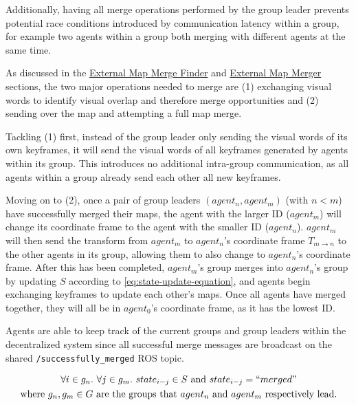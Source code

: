 Additionally, having all merge operations performed by the group leader prevents potential race conditions introduced by communication latency within a group, for example two agents within a group both merging with different agents at the same time.

As discussed in the \hyperref[sec:external-map-merge-finder]{External Map Merge Finder} and \hyperref[sec:external-map-merger]{External Map Merger} sections, the two major operations needed to merge are (1) exchanging visual words to identify visual overlap and therefore merge opportunities and (2) sending over the map and attempting a full map merge.

Tackling (1) first, instead of the group leader only sending the visual words of its own keyframes, it will send the visual words of all keyframes generated by agents within its group. This introduces no additional intra-group communication, as all agents within a group already send each other all new keyframes.

Moving on to (2), once a pair of group leaders $(agent_n, agent_m)$ (with $n<m$) have successfully merged their maps, the agent with the larger ID ($agent_m$) will change its coordinate frame to the agent with the smaller ID ($agent_n$). $agent_m$ will then send the transform from $agent_m$ to $agent_n$'s coordinate frame $T_{m \to n}$ to the other agents in its group, allowing them to also change to $agent_n$'s coordinate frame. After this has been completed, $agent_m$'s group merges into $agent_n$'s group by updating $S$ according to \autoref{eq:state-update-equation}, and agents begin exchanging keyframes to update each other's maps. Once all agents have merged together, they will all be in $agent_0$'s coordinate frame, as it has the lowest ID.

Agents are able to keep track of the current groups and group leaders within the decentralized system since all successful merge messages are broadcast on the shared \texttt{/successfully\_merged} ROS topic.

\begin{equation}
    \begin{gathered} \label{eq:state-update-equation}
        \forall i \in g_n. \ \forall j \in g_m. \ state_{i-j} \in S \text{ and } state_{i-j} = ``merged" \\ \text{where $g_n, g_m \in G$ are the groups that $agent_n$ and $agent_m$ respectively lead.}
    \end{gathered}
\end{equation}

